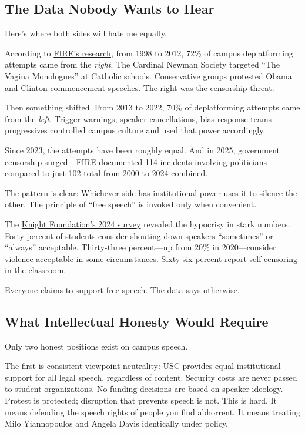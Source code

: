\documentclass[11pt]{article}
\begin{document}
\subsection{The Data Nobody Wants to Hear}

Here's where both sides will hate me equally.

According to \href{https://www.thefire.org/news/worst-both-worlds-campus-free-speech}{FIRE's research}, from 1998 to 2012, 72\% of campus deplatforming attempts came from the \textit{right}. The Cardinal Newman Society targeted ``The Vagina Monologues'' at Catholic schools. Conservative groups protested Obama and Clinton commencement speeches. The right was the censorship threat.

Then something shifted. From 2013 to 2022, 70\% of deplatforming attempts came from the \textit{left}. Trigger warnings, speaker cancellations, bias response teams---progressives controlled campus culture and used that power accordingly.

Since 2023, the attempts have been roughly equal. And in 2025, government censorship surged---FIRE documented 114 incidents involving politicians compared to just 102 total from 2000 to 2024 combined.

The pattern is clear: Whichever side has institutional power uses it to silence the other. The principle of ``free speech'' is invoked only when convenient.

The \href{https://knightfoundation.org/reports/college-student-views-on-free-expression-and-campus-speech-2024/}{Knight Foundation's 2024 survey} revealed the hypocrisy in stark numbers. Forty percent of students consider shouting down speakers ``sometimes'' or ``always'' acceptable. Thirty-three percent---up from 20\% in 2020---consider violence acceptable in some circumstances. Sixty-six percent report self-censoring in the classroom.

Everyone claims to support free speech. The data says otherwise.

\subsection{What Intellectual Honesty Would Require}

Only two honest positions exist on campus speech.

The first is consistent viewpoint neutrality: USC provides equal institutional support for all legal speech, regardless of content. Security costs are never passed to student organizations. No funding decisions are based on speaker ideology. Protest is protected; disruption that prevents speech is not. This is hard. It means defending the speech rights of people you find abhorrent. It means treating Milo Yiannopoulos and Angela Davis identically under policy.
\end{document}
